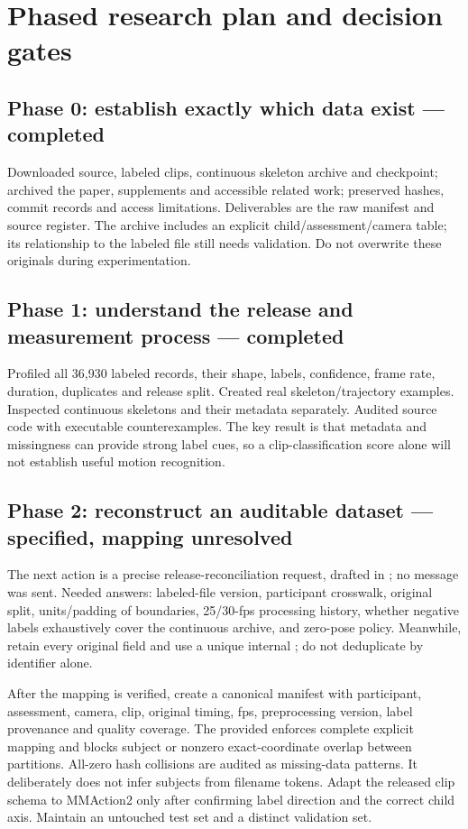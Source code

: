 \section{Phased research plan and decision gates}\label{sec:plan}
\subsection{Phase 0: establish exactly which data exist --- completed}
Downloaded source, labeled clips, continuous skeleton archive and checkpoint; archived the paper, supplements and accessible related work; preserved hashes, commit records and access limitations. Deliverables are the raw manifest and source register. The archive includes an explicit child/assessment/camera table; its relationship to the labeled file still needs validation. Do not overwrite these originals during experimentation.

\subsection{Phase 1: understand the release and measurement process --- completed}
Profiled all 36,930 labeled records, their shape, labels, confidence, frame rate, duration, duplicates and release split. Created real skeleton/trajectory examples. Inspected continuous skeletons and their metadata separately. Audited source code with executable counterexamples. The key result is that metadata and missingness can provide strong label cues, so a clip-classification score alone will not establish useful motion recognition.

\subsection{Phase 2: reconstruct an auditable dataset --- specified, mapping unresolved}
The next action is a precise release-reconciliation request, drafted in ; no message was sent. Needed answers: labeled-file version, participant crosswalk, original split, units/padding of boundaries, 25/30-fps processing history, whether negative labels exhaustively cover the continuous archive, and zero-pose policy. Meanwhile, retain every original field and use a unique internal ; do not deduplicate by identifier alone.

After the mapping is verified, create a canonical manifest with participant, assessment, camera, clip, original timing, fps, preprocessing version, label provenance and quality coverage. The provided  enforces complete explicit mapping and blocks subject or nonzero exact-coordinate overlap between partitions. All-zero hash collisions are audited as missing-data patterns. It deliberately does not infer subjects from filename tokens. Adapt the released clip schema to MMAction2 only after confirming label direction and the correct child axis. Maintain an untouched test set and a distinct validation set.

